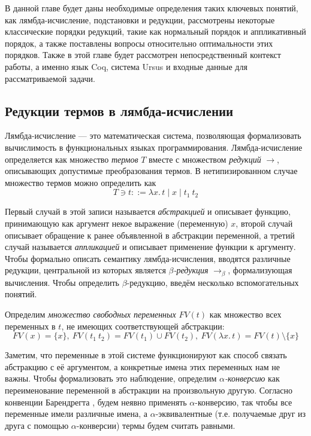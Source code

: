 \documentclass[../thesis.tex]{subfiles}
\begin{document}
\label{sec:1}

В данной главе будет даны необходимые определения таких ключевых понятий, как лямбда-исчисление, подстановки и редукции, рассмотрены некоторые классические порядки редукций, такие как нормальный порядок и аппликативный порядок, а также поставлены вопросы относительно оптимальности этих порядков. Также в этой главе будет рассмотрен непосредственный контекст работы, а именно язык Coq, система Ursus и входные данные для рассматриваемой задачи.

\subsection{Редукции термов в лямбда-исчислении}

Лямбда-исчисление \cite{lambda_calculus} --- это математическая система, позволяющая формализовать вычислимость в функциональных языках программирования. Лямбда-исчисление определяется как множество \textit{термов} $T$ вместе с множеством \textit{редукций} $\rightarrow$, описывающих допустимые преобразования термов. В нетипизированном случае множество термов можно определить как
\begin{equation}
T \ni t ::= \lambda x.\, t \mid x \mid t_1\ t_2
\end{equation}

Первый случай в этой записи называется \textit{абстракцией} и описывает функцию, принимающую как аргумент некое выражение (переменную) $x$, второй случай описывает обращение к ранее объявленной в абстракции переменной, а третий случай называется \textit{аппликацией} и описывает применение функции к аргументу. Чтобы формально описать семантику лямбда-исчисления, вводятся различные редукции, центральной из которых является \textit{$\beta$-редукция} $\rightarrow_\beta$, формализующая вычисления. Чтобы определить $\beta$-редукцию, введём несколько вспомогательных понятий.

Определим \textit{множество свободных переменных} $FV(t)$ как множество всех переменных в $t$, не имеющих соответствующей абстракции:
\begin{equation}
FV(x) = \{x\},\ FV(t_1\ t_2) = FV(t_1) \cup FV(t_2),\ FV(\lambda x.\, t) = FV(t) \setminus \{x\}
\end{equation}

Заметим, что переменные в этой системе функционируют как способ связать абстракцию с её аргументом, а конкретные имена этих переменных нам не важны. Чтобы формализовать это наблюдение, определим \textit{$\alpha$-конверсию} как переименование переменной в абстракции на произвольную другую. Согласно конвенции Барендрегта \cite{lambda_calculus}, будем неявно применять $\alpha$-конверсию, так чтобы все переменные имели различные имена, а $\alpha$-эквивалентные (т.е. получаемые друг из друга с помощью $\alpha$-конверсии) термы будем считать равными.
\end{document}
